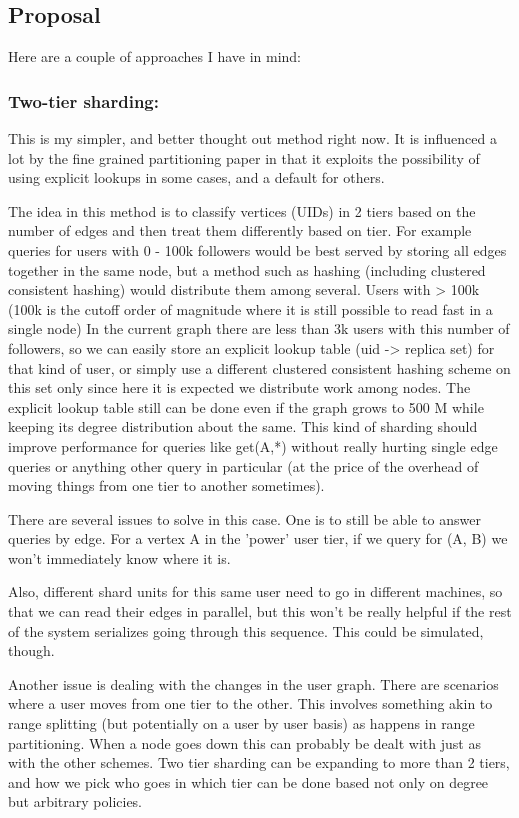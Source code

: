 \documentclass[draft]{article}
\begin{document}
\subsection{Proposal}

Here are a couple of approaches  I have in mind:

\subsubsection{Two-tier sharding:}

This is my simpler, and better thought out method right now. It is influenced a lot by the fine grained partitioning paper in that it exploits the possibility of using explicit lookups in some cases, and a default for others.

The idea in this method is to classify vertices (UIDs) in 2 tiers based on the number of edges and then treat them differently based on tier. For example  queries for users with 0 - 100k  followers would be best served by storing all edges together in the same node, but a method such as hashing (including clustered consistent hashing) would distribute them among several.  Users with > 100k (100k is the cutoff order of magnitude where it is still possible to read fast in a single node) In the current graph there are less than 3k users with this number of followers,  so we can easily store an explicit lookup table (uid -> replica set) for that kind of user, or simply use a different clustered consistent hashing scheme on this set only since here it is expected we distribute work among nodes.  The explicit lookup table still can be done even if the graph grows to 500 M while keeping its degree distribution about the same.  This kind of sharding should improve performance for queries like get(A,*) without really hurting single edge queries or anything other query in particular (at the price of  the overhead of moving things from one tier to another sometimes).

There are several issues to solve in this case. One is to still be able to answer queries by edge. For a vertex A in the 'power' user tier, if we query for (A, B) we won't immediately know where it is.   

Also, different shard units for this same user need to go in different machines, so that we can read their edges in parallel, but this won't be really helpful if the rest of the system serializes going through this sequence. This could be simulated, though.

 Another issue is dealing with the changes in the user graph. There are scenarios where a user moves from one tier to the other. This involves something akin to range splitting (but potentially on a user by user basis) as happens in range partitioning.   When a node goes down this can probably be dealt with just as with the other schemes.  Two tier sharding can be expanding to more than 2 tiers, and how we pick who goes in which tier can be done based not only on degree but arbitrary policies.  
\end{document}
